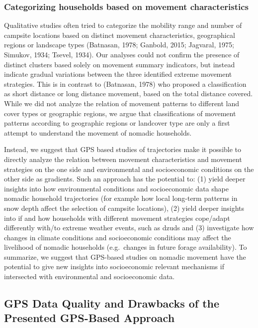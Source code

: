 \documentclass[]{elsarticle} %
\begin{document}
\hypertarget{categorizing-households-based-on-movement-characteristics}{%
\subsubsection{Categorizing households based on movement
characteristics}\label{categorizing-households-based-on-movement-characteristics}}

Qualitative studies often tried to categorize the mobility range and
number of campsite locations based on distinct movement characteristics,
geographical regions or landscape types (Batnasan, 1978; Ganbold, 2015;
Jagvaral, 1975; Simukov, 1934; Tsevel, 1934). Our analyses could not
confirm the presence of distinct clusters based solely on movement
summary indicators, but instead indicate gradual variations between the
three identified extreme movement strategies. This is in contrast to
(Batnasan, 1978) who proposed a classification as short distance or long
distance movement, based on the total distance covered. While we did not
analyze the relation of movement patterns to different land cover types
or geographic regions, we argue that classifications of movement
patterns according to geographic regions or landcover type are only a
first attempt to understand the movement of nomadic households.

Instead, we suggest that GPS based studies of trajectories make it
possible to directly analyze the relation between movement
characteristics and movement strategies on the one side and
environmental and socioeconomic conditions on the other side as
gradients. Such an approach has the potential to: (1) yield deeper
insights into how environmental conditions and socioeconomic data shape
nomadic household trajectories (for example how local long-term patterns
in snow depth affect the selection of campsite locations), (2) yield
deeper insights into if and how households with different movement
strategies cope/adapt differently with/to extreme weather events, such
as dzuds and (3) investigate how changes in climate conditions and
socioeconomic conditions may affect the livelihood of nomadic households
(e.g.~changes in future forage availability). To summarize, we suggest
that GPS-based studies on nomadic movement have the potential to give
new insights into socioeconomic relevant mechanisms if intersected with
environmental and socioeconomic data.

\hypertarget{gps-data-quality-and-drawbacks-of-the-presented-gps-based-approach}{%
\subsection{GPS Data Quality and Drawbacks of the Presented GPS-Based
Approach}\label{gps-data-quality-and-drawbacks-of-the-presented-gps-based-approach}}
\end{document}
